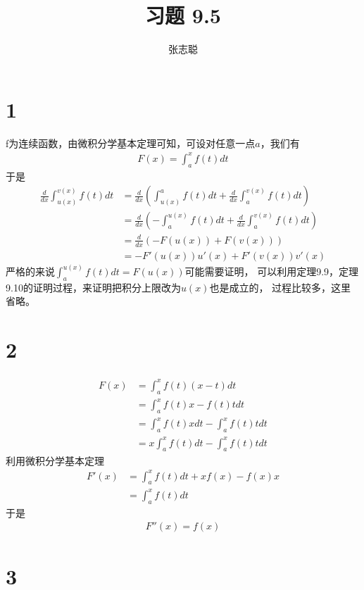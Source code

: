 \documentclass{article}
\begin{document}
\title{习题 9.5}
\author{张志聪}
\maketitle

\section*{1}

f为连续函数，由微积分学基本定理可知，可设对任意一点$a$，我们有
\begin{align*}
  F(x) = \int_a^x f(t) dt
\end{align*}
于是
\begin{align*}
  \frac{d}{dx} \int_{u(x)}^{v(x)} f(t) dt
   & = \frac{d}{dx} \left(\int_{u(x)}^{a} f(t) dt + \frac{d}{dx} \int_{a}^{v(x)} f(t) dt\right)   \\
   & = \frac{d}{dx} \left(- \int_{a}^{u(x)} f(t) dt + \frac{d}{dx} \int_{a}^{v(x)} f(t) dt\right) \\
   & = \frac{d}{dx} \left( - F(u(x)) + F(v(x)) \right)                                            \\
   & = - F'(u(x))u'(x) + F'(v(x))v'(x)
\end{align*}
严格的来说$\int_{a}^{u(x)} f(t) dt = F(u(x))$可能需要证明，
可以利用定理9.9，定理9.10的证明过程，来证明把积分上限改为$u(x)$也是成立的，
过程比较多，这里省略。

\section*{2}
\begin{align*}
  F(x) & = \int_a^x f(t) (x - t) dt               \\
       & = \int_a^x f(t)x - f(t)t dt              \\
       & = \int_a^x f(t)x dt - \int_a^x f(t)t dt  \\
       & = x \int_a^x f(t) dt - \int_a^x f(t)t dt
\end{align*}
利用微积分学基本定理
\begin{align*}
  F'(x) & = \int_a^x f(t) dt + x f(x) - f(x) x \\
        & = \int_a^x f(t) dt
\end{align*}
于是
\begin{align*}
  F''(x) = f(x)
\end{align*}

\section*{3}
\end{document}
